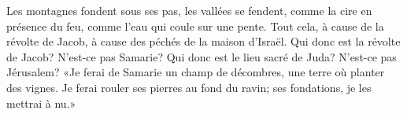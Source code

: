 Les montagnes fondent sous ses pas, les vallées se fendent,
	comme la cire en présence du feu, comme l’eau qui coule sur une pente.
Tout cela, à cause de la révolte de Jacob,
	à cause des péchés de la maison d’Israël.
Qui donc est la révolte de Jacob? N’est-ce pas Samarie?
Qui donc est le lieu sacré de Juda? N’est-ce pas Jérusalem?
«Je ferai de Samarie un champ de décombres, une terre où planter des vignes.
	Je ferai rouler ses pierres au fond du ravin; ses fondations, je les mettrai à nu.»
